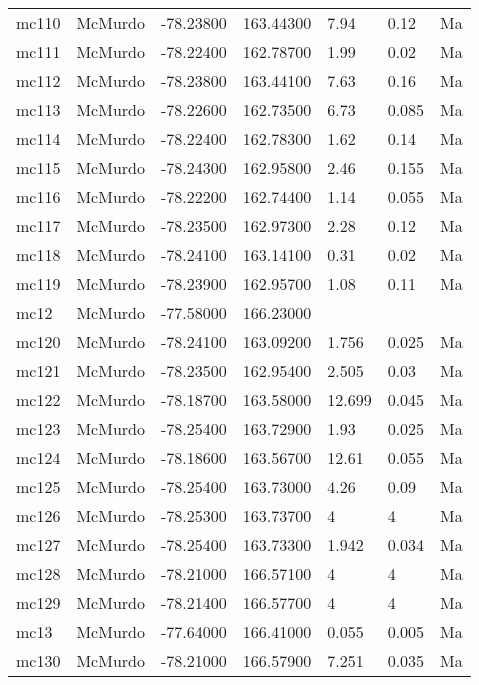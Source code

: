 \documentclass{article}
\begin{document}
\begin{longtable}{llrrlll}
 mc110 &  McMurdo & -78.23800 &  163.44300 &    7.94 &      0.12 &    Ma \\
 mc111 &  McMurdo & -78.22400 &  162.78700 &    1.99 &      0.02 &    Ma \\
 mc112 &  McMurdo & -78.23800 &  163.44100 &    7.63 &      0.16 &    Ma \\
 mc113 &  McMurdo & -78.22600 &  162.73500 &    6.73 &     0.085 &    Ma \\
 mc114 &  McMurdo & -78.22400 &  162.78300 &    1.62 &      0.14 &    Ma \\
 mc115 &  McMurdo & -78.24300 &  162.95800 &    2.46 &     0.155 &    Ma \\
 mc116 &  McMurdo & -78.22200 &  162.74400 &    1.14 &     0.055 &    Ma \\
 mc117 &  McMurdo & -78.23500 &  162.97300 &    2.28 &      0.12 &    Ma \\
 mc118 &  McMurdo & -78.24100 &  163.14100 &    0.31 &      0.02 &    Ma \\
 mc119 &  McMurdo & -78.23900 &  162.95700 &    1.08 &      0.11 &    Ma \\
  mc12 &  McMurdo & -77.58000 &  166.23000 &         &           &       \\
 mc120 &  McMurdo & -78.24100 &  163.09200 &   1.756 &     0.025 &    Ma \\
 mc121 &  McMurdo & -78.23500 &  162.95400 &   2.505 &      0.03 &    Ma \\
 mc122 &  McMurdo & -78.18700 &  163.58000 &  12.699 &     0.045 &    Ma \\
 mc123 &  McMurdo & -78.25400 &  163.72900 &    1.93 &     0.025 &    Ma \\
 mc124 &  McMurdo & -78.18600 &  163.56700 &   12.61 &     0.055 &    Ma \\
 mc125 &  McMurdo & -78.25400 &  163.73000 &    4.26 &      0.09 &    Ma \\
 mc126 &  McMurdo & -78.25300 &  163.73700 &       4 &         4 &    Ma \\
 mc127 &  McMurdo & -78.25400 &  163.73300 &   1.942 &     0.034 &    Ma \\
 mc128 &  McMurdo & -78.21000 &  166.57100 &       4 &         4 &    Ma \\
 mc129 &  McMurdo & -78.21400 &  166.57700 &       4 &         4 &    Ma \\
  mc13 &  McMurdo & -77.64000 &  166.41000 &   0.055 &     0.005 &    Ma \\
 mc130 &  McMurdo & -78.21000 &  166.57900 &   7.251 &     0.035 &    Ma \\

\end{longtable}
\end{document}
